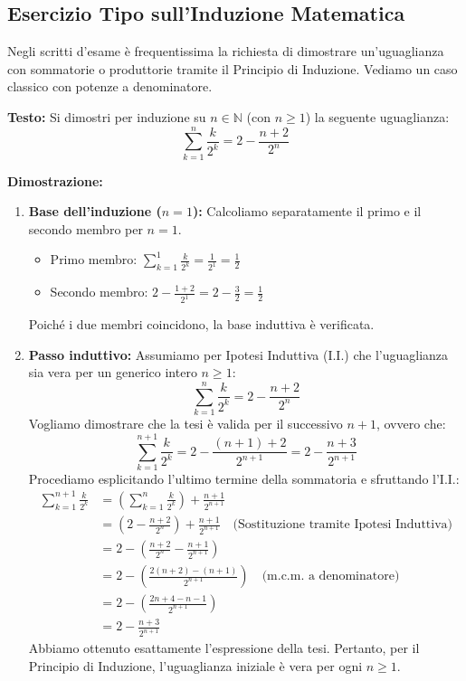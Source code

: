 \documentclass[12pt, a4paper]{article}
\begin{document}
\subsection{Esercizio Tipo sull'Induzione Matematica}
Negli scritti d'esame è frequentissima la richiesta di dimostrare un'uguaglianza con sommatorie o produttorie tramite il Principio di Induzione. Vediamo un caso classico con potenze a denominatore.

\textbf{Testo:} Si dimostri per induzione su $n \in \mathbb{N}$ (con $n \ge 1$) la seguente uguaglianza:
\[ \sum_{k=1}^{n} \frac{k}{2^k} = 2 - \frac{n+2}{2^n} \]

\textbf{Dimostrazione:}
\begin{enumerate}
    \item \textbf{Base dell'induzione ($n=1$):}
    Calcoliamo separatamente il primo e il secondo membro per $n=1$.
    \begin{itemize}
        \item Primo membro: $\sum_{k=1}^{1} \frac{k}{2^k} = \frac{1}{2^1} = \frac{1}{2}$
        \item Secondo membro: $2 - \frac{1+2}{2^1} = 2 - \frac{3}{2} = \frac{1}{2}$
    \end{itemize}
    Poiché i due membri coincidono, la base induttiva è verificata.

    \item \textbf{Passo induttivo:}
    Assumiamo per Ipotesi Induttiva (I.I.) che l'uguaglianza sia vera per un generico intero $n \ge 1$:
    \[ \sum_{k=1}^{n} \frac{k}{2^k} = 2 - \frac{n+2}{2^n} \]
    Vogliamo dimostrare che la tesi è valida per il successivo $n+1$, ovvero che:
    \[ \sum_{k=1}^{n+1} \frac{k}{2^k} = 2 - \frac{(n+1)+2}{2^{n+1}} = 2 - \frac{n+3}{2^{n+1}} \]
    Procediamo esplicitando l'ultimo termine della sommatoria e sfruttando l'I.I.:
    \begin{align*}
        \sum_{k=1}^{n+1} \frac{k}{2^k} &= \left( \sum_{k=1}^{n} \frac{k}{2^k} \right) + \frac{n+1}{2^{n+1}} \\
        &= \left( 2 - \frac{n+2}{2^n} \right) + \frac{n+1}{2^{n+1}} \quad \text{(Sostituzione tramite Ipotesi Induttiva)} \\
        &= 2 - \left( \frac{n+2}{2^n} - \frac{n+1}{2^{n+1}} \right) \\
        &= 2 - \left( \frac{2(n+2) - (n+1)}{2^{n+1}} \right) \quad \text{(m.c.m. a denominatore)} \\
        &= 2 - \left( \frac{2n + 4 - n - 1}{2^{n+1}} \right) \\
        &= 2 - \frac{n+3}{2^{n+1}}
    \end{align*}
    Abbiamo ottenuto esattamente l'espressione della tesi. Pertanto, per il Principio di Induzione, l'uguaglianza iniziale è vera per ogni $n \ge 1$.
\end{enumerate}
\end{document}
